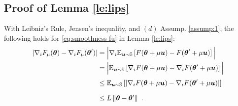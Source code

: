 \begin{appendices}
\subsection{Proof of Lemma \ref{le:lips}\label{proof:lips}}

With Leibniz's Rule, Jensen's inequality, and $(d)$ Assump. \ref{assump:1}, the following holds for \eqref{eq:smoothness-fu} in Lemma \ref{le:lips}:
\begin{equation}
\begin{aligned}
\left|\nabla_i F_{\mu}({\bm{\theta}}) - \nabla_i F_{\mu}({\bm{\theta}}')\right| &= \Big|\nabla_i \mathbb{E}_{{\bm{u}} \sim {\mathbb{S}}}\left[F({\bm{\theta}}+\mu {\bm{u}})  - F({\bm{\theta}}'+\mu {\bm{u}})\right]\Big| \\
&= \Big|\mathbb{E}_{{\bm{u}} \sim {\mathbb{S}}}\left[ \nabla_i F({\bm{\theta}}+\mu {\bm{u}}) - \nabla_i F({\bm{\theta}}'+\mu {\bm{u}})\right]\Big| \\[3pt]
&\leq \mathbb{E}_{{\bm{u}} \sim {\mathbb{S}}}\left[\left|\nabla_i F({\bm{\theta}}+\mu {\bm{u}}) - \nabla_i F({\bm{\theta}}'+\mu {\bm{u}})\right|\right] \\[7pt]
&\leq L\left\|{\bm{\theta}} - {\bm{\theta}}'\right\| \ .
\end{aligned}
\end{equation}


\end{appendices}
